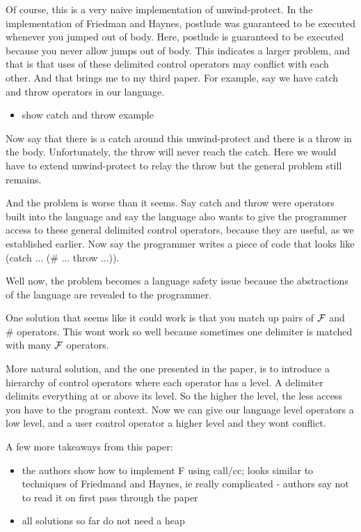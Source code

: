 \documentclass[letterpaper]{llncs}
\begin{document}
Of course, this is a very naive implementation of unwind-protect. In the implementation of Friedman and Haynes, postlude was guaranteed to be executed whenever you jumped out of body. Here, postlude is guaranteed to be executed because you never allow jumps out of body. This indicates a larger problem, and that is that uses of these delimited control operators may conflict with each other. And that brings me to my third paper. For example, say we have catch and throw operators in our language.

\begin{itemize}	
	\item show catch and throw example
\end{itemize}

Now say that there is a catch around this unwind-protect and there is a throw in the body. Unfortunately, the throw will never reach the catch. Here we would have to extend unwind-protect to relay the throw but the general problem still remains.

And the problem is worse than it seems. Say catch and throw were operators built into the language and say the language also wants to give the programmer access to these general delimited control operators, because they are useful, as we established earlier. Now say the programmer writes a piece of code that looks like (catch ... (\# ... throw ...)).

Well now, the problem becomes a language safety issue because the abstractions of the language are revealed to the programmer.

One solution that seems like it could work is that you match up pairs of $ \mathcal{F} $ and \# operators. This wont work so well because sometimes one delimiter is matched with many $ \mathcal{F} $ operators.

More natural solution, and the one presented in the paper, is to introduce a hierarchy of control operators where each operator has a level. A delimiter delimits everything at or above its level. So the higher the level, the less access you have to the program context. Now we can give our language level operators a low level, and a user control operator a higher level and they wont conflict.


A few more takeaways from this paper:

\begin{itemize}
	\item the authors show how to implement F using call/cc; looks similar to techniques of Friedmand and Haynes, ie really complicated - authors say not to read it on first pass through the paper
	\item all solutions so far do not need a heap
\end{itemize}
\end{document}
